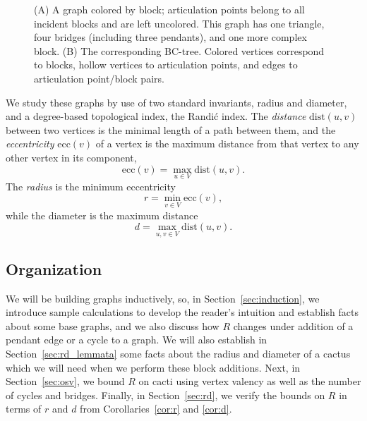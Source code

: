 \documentclass{amsart}
\theoremstyle{definition}
\newcommand{\dist}{\text{dist}}
\begin{document}
\begin{figure}
\begin{center}
\begin{subfigure}[scale=0.5]{0.4\textwidth}
\begin{center}
\end{center} 
\subcaption{}\label{fig:bc-tree-b}
\end{subfigure}
\end{center}
\caption{(A) A graph colored by block; articulation points belong to all incident blocks and are left uncolored. This graph has one triangle, four bridges (including three pendants), and one more complex block. (B) The corresponding BC-tree. Colored vertices correspond to blocks, hollow vertices to articulation points, and edges to articulation point/block pairs.}\label{fig:bc-tree}
\end{figure}


We study these graphs by use of two standard invariants, radius and diameter, and a degree-based topological index, the Randi\'c index. The \emph{distance} $\dist(u,v)$ between two vertices is the minimal length of a path between them, and the \emph{eccentricity} $\text{ecc}(v)$ of a vertex is the maximum distance from that vertex to any other vertex in its component,
\[\text{ecc}(v)=\max_{u\in V} \dist(u,v).\]
The \emph{radius} is the minimum eccentricity
\[r = \min_{v\in V} \text{ecc}(v),\]
while the diameter is the maximum distance
\[d = \max_{u,v\in V} \dist(u,v).\]


\subsection*{Organization} We will be building graphs inductively, so, in Section~\ref{sec:induction}, we introduce sample calculations to develop the reader's intuition and establish facts about some base graphs, and we also discuss how $R$ changes under addition of a pendant edge or a cycle to a graph. We will also establish in Section~\ref{sec:rd_lemmata} some facts about the radius and diameter of a cactus which we will need when we perform these block additions. Next, in Section~\ref{sec:osv}, we bound $R$ on cacti using vertex valency as well as the number of cycles and bridges. Finally, in Section~\ref{sec:rd}, we verify the bounds on $R$ in terms of $r$ and $d$ from Corollaries~\ref{cor:r} and \ref{cor:d}.
\end{document}
